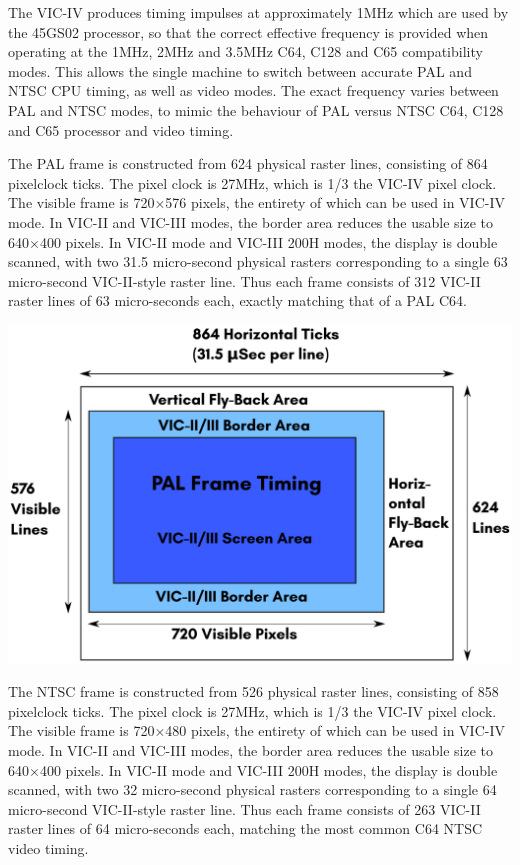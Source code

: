 The VIC-IV produces timing impulses at approximately 1MHz which are used by the 45GS02 processor, so that the correct effective frequency is provided when operating at the 1MHz, 2MHz and 3.5MHz C64, C128 and C65 compatibility modes.  This allows the single machine to switch between accurate PAL and NTSC CPU timing, as well as video modes. The exact frequency varies between PAL and NTSC modes, to mimic the behaviour of PAL versus NTSC C64, C128 and C65 processor and video timing.

The PAL frame is constructed from 624 physical raster lines, consisting of 864 pixelclock ticks. The pixel clock is 27MHz, which is 1/3 the VIC-IV pixel clock.  The visible frame is 720$\times$576 pixels, the entirety of which can be used in VIC-IV mode. In VIC-II and VIC-III modes, the border area reduces the usable size to 640$\times$400 pixels.  In VIC-II mode and VIC-III 200H modes, the display is double scanned, with two 31.5 micro-second physical rasters corresponding to a single 63 micro-second VIC-II-style raster line.  Thus each frame consists of 312 VIC-II raster lines of 63 micro-seconds each, exactly matching that of a PAL C64.

\includegraphics[width=\linewidth]{images/illustrations/VIC-IV-PAL-Frame.pdf}

The NTSC frame is constructed from 526 physical raster lines, consisting of 858 pixelclock ticks. The pixel clock is 27MHz, which is 1/3 the VIC-IV pixel clock.  The visible frame is 720$\times$480 pixels, the entirety of which can be used in VIC-IV mode. In VIC-II and VIC-III modes, the border area reduces the usable size to 640$\times$400 pixels.  In VIC-II mode and VIC-III 200H modes, the display is double scanned, with two 32 micro-second physical rasters corresponding to a single 64 micro-second VIC-II-style raster line.  Thus each frame consists of 263 VIC-II raster lines of 64 micro-seconds each, matching the most common C64 NTSC video timing.


